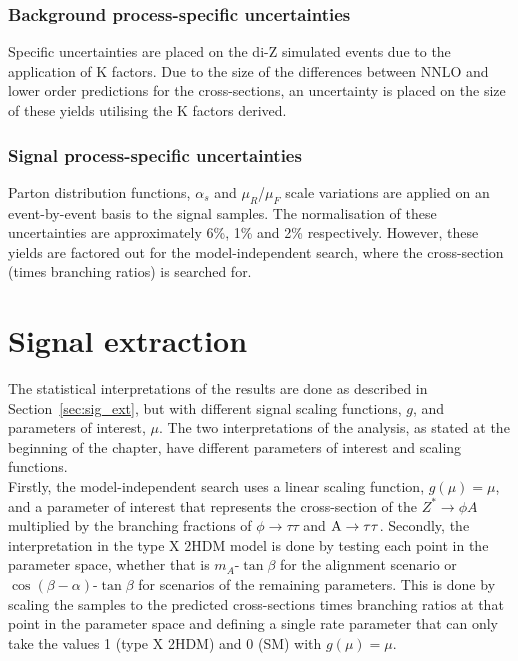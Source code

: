 \subsubsection{Background process-specific uncertainties}
Specific uncertainties are placed on the di-Z simulated events due to the application of K factors.
Due to the size of the differences between \ac{NNLO} and lower order predictions for the cross-sections, an uncertainty is placed on the size of these yields utilising the K factors derived.

\subsubsection{Signal process-specific uncertainties}
Parton distribution functions, $\alpha_s$ and $\mu_{R}$/$\mu_{F}$ scale variations are applied on an event-by-event basis to the signal samples.
The normalisation of these uncertainties are approximately 6\%, 1\% and 2\% respectively. 
However, these yields are factored out for the model-independent search, where the cross-section (times branching ratios) is searched for.

\section{Signal extraction}

The statistical interpretations of the results are done as described in Section~\ref{sec:sig_ext}, but with different signal scaling functions, $g$, and parameters of interest, $\mu$.
The two interpretations of the analysis, as stated at the beginning of the chapter, have different parameters of interest and scaling functions. \\

Firstly, the model-independent search uses a linear scaling function, $g(\mu)=\mu$, and a parameter of interest that represents the cross-section of the $Z^{*}\rightarrow \phi A$ multiplied by the branching fractions of $\phi\rightarrow\tau\tau$ and ${\text{A}}\rightarrow\tau\tau$.
Secondly, the interpretation in the type X \ac{2HDM} model is done by testing each point in the parameter space, whether that is $m_{A}$-$\tan\beta$ for the alignment scenario or $\cos(\beta-\alpha)$-$\tan\beta$ for scenarios of the remaining parameters. 
This is done by scaling the samples to the predicted cross-sections times branching ratios at that point in the parameter space and defining a single rate parameter that can only take the values 1 (type X \ac{2HDM}) and 0 (\ac{SM}) with $g(\mu)=\mu$.

